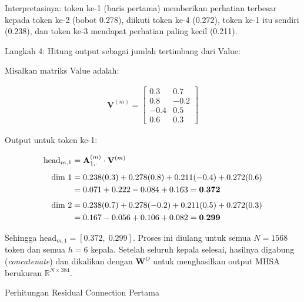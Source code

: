 \noindent
Interpretasinya: token ke-1 (baris pertama) memberikan perhatian
terbesar kepada token ke-2 (bobot 0.278), diikuti token ke-4 (0.272),
token ke-1 itu sendiri (0.238), dan token ke-3 mendapat perhatian
paling kecil (0.211).
 
\vspace{0.5cm}
\noindent Langkah 4: Hitung output sebagai jumlah tertimbang dari Value:
 
\vspace{0.5cm}
\noindent
Misalkan matriks Value adalah:
 
\vspace{0.5cm}
\begin{align*}
  \mathbf{V}^{(m)}
  = \begin{bmatrix}
      0.3 & 0.7 \\ 0.8 & -0.2 \\ -0.4 & 0.5 \\ 0.6 & 0.3
    \end{bmatrix}
\end{align*}
\vspace{0.5cm}
 
\noindent
Output untuk token ke-1:
 
\vspace{0.5cm}
\begin{align*}
  \mathrm{head}_{m,1}
  &= \mathbf{A}^{(m)}_{1,\cdot} \cdot \mathbf{V}^{(m)} \notag \\[4pt]
  \text{dim 1}
  &= 0.238(0.3) + 0.278(0.8) + 0.211(-0.4) + 0.272(0.6) \notag \\
  &= 0.071 + 0.222 - 0.084 + 0.163
   = \mathbf{0.372} \notag \\[4pt]
  \text{dim 2}
  &= 0.238(0.7) + 0.278(-0.2) + 0.211(0.5) + 0.272(0.3) \notag \\
  &= 0.167 - 0.056 + 0.106 + 0.082
   = \mathbf{0.299}
\end{align*}
\vspace{0.5cm}
 
\noindent
Sehingga $\mathrm{head}_{m,1} = [0.372,\; 0.299]$.
Proses ini diulang untuk semua $N=1568$ token dan semua $h=6$ kepala.
Setelah seluruh kepala selesai, hasilnya digabung (\textit{concatenate})
dan dikalikan dengan $\mathbf{W}^O$ untuk menghasilkan output MHSA
berukuran $\mathbb{R}^{N \times 384}$.
 
\vspace{0.5cm}
\noindent Perhitungan Residual Connection Pertama\par
\vspace{0.3cm}
 
